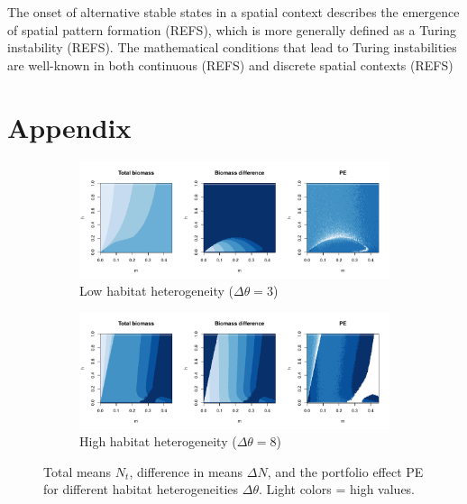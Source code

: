 \documentclass[twocolumn,preprintnumbers,amsmath,amssymb,superscriptaddress]{revtex4}
\begin{document}
The onset of alternative stable states in a spatial context describes the emergence of spatial pattern formation (REFS), which is more generally defined as a Turing instability (REFS).
The mathematical conditions that lead to Turing instabilities are well-known in both continuous (REFS) and discrete spatial contexts (REFS)




\clearpage
\setcounter{figure}{0}
\section*{Appendix}


\begin{figure}[h!]
\centering
\begin{subfigure}[t]{0.55\textwidth}
\centering
\includegraphics[width=\textwidth]{figs/fig_MDPE_hm_theta3.pdf} 
\caption{Low habitat heterogeneity ($\Delta\theta=3$)} \label{fig:thetadiff1}
\end{subfigure}
\begin{subfigure}[t]{0.55\textwidth}
\centering
\includegraphics[width=\textwidth]{figs/fig_MDPE_hm_theta8.pdf} 
\caption{High habitat heterogeneity ($\Delta\theta=8$)} \label{fig:thetadiff2}
\end{subfigure}
\caption{Total means $N_t$, difference in means $\Delta N$, and the portfolio effect PE for different habitat heterogeneities $\Delta\theta$. Light colors = high values.
}
\end{figure}
\end{document}
